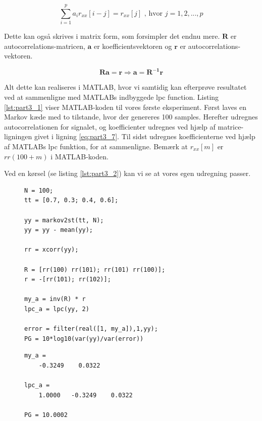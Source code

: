 \begin{itemize}
	\begin{equation}
		\sum^p_{i=1} a_i r_{xx}[i-j] = r_{xx}[j] \text{ , hvor } j = 1,2,...,p
	\end{equation}

	Dette kan også skrives i matrix form, som forsimpler det endnu mere. $\mathbf{R}$ er autocorrelations-matricen, $\mathbf{a}$ er koefficientsvektoren og $\mathbf{r}$ er autocorrelations-vektoren.

	\begin{equation}\label{eq:part3_7}
		\mathbf{Ra} = \mathbf{r} \Rightarrow \mathbf{a} = \mathbf{R^{-1} r}
	\end{equation}
\end{itemize}


Alt dette kan realiseres i MATLAB, hvor vi samtidig kan efterprøve resultatet ved at sammenligne med MATLABs indbyggede lpc function. Listing \ref{lst:part3_1} viser MATLAB-koden til vores første eksperiment. Først laves en Markov kæde med to tilstande, hvor der genereres 100 samples. Herefter udregnes autocorrelationen for signalet, og koefficienter udregnes ved hjælp af matrice-ligningen givet i ligning \ref{eq:part3_7}. Til sidst udregnes koefficienterne ved hjælp af MATLABs lpc funktion, for at sammenligne. Bemærk at $r_{xx}[m]$ er $rr(100 + m)$ i MATLAB-koden.

Ved en kørsel (se listing \ref{lst:part3_2}) kan vi se at vores egen udregning passer. 

\lstset{language=MATLAB,numbers=left}
\begin{figure}
	\begin{lstlisting}[frame=single, caption=Udregning af LPC koefficienter,label=lst:part3_1]
N = 100;
tt = [0.7, 0.3; 0.4, 0.6];

yy = markov2st(tt, N);
yy = yy - mean(yy);

rr = xcorr(yy);

R = [rr(100) rr(101); rr(101) rr(100)];
r = -[rr(101); rr(102)];

my_a = inv(R) * r
lpc_a = lpc(yy, 2)

error = filter(real([1, my_a]),1,yy);
PG = 10*log10(var(yy)/var(error))
	\end{lstlisting}
\end{figure}


\lstset{language=MATLAB,numbers=left}
\begin{figure}
	\begin{lstlisting}[frame=single, caption=Udregning af LPC koefficienter - output,label=lst:part3_2]
my_a =
    -0.3249    0.0322

lpc_a =
    1.0000   -0.3249    0.0322

PG = 10.0002
	\end{lstlisting}
\end{figure}

